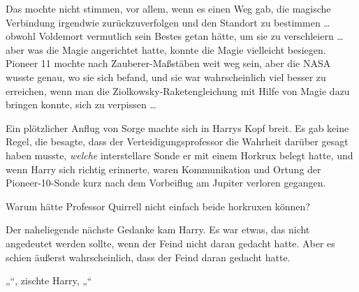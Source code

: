 Das mochte nicht stimmen, vor allem, wenn es einen Weg gab, die magische Verbindung irgendwie zurückzuverfolgen und den Standort zu bestimmen … obwohl Voldemort vermutlich sein Bestes getan hätte, um sie zu verschleiern … aber was die Magie angerichtet hatte, konnte die Magie vielleicht besiegen. Pioneer 11 mochte nach Zauberer-Maßstäben weit weg sein, aber die NASA wusste genau, wo sie sich befand, und sie war wahrscheinlich viel besser zu erreichen, wenn man die Ziolkowsky-Raketengleichung mit Hilfe von Magie dazu bringen konnte, sich zu verpissen …

Ein plötzlicher Anflug von Sorge machte sich in Harrys Kopf breit. Es gab keine Regel, die besagte, dass der Verteidigungsprofessor die Wahrheit darüber gesagt haben musste, \emph{welche} interstellare Sonde er mit einem Horkrux belegt hatte, und wenn Harry sich richtig erinnerte, waren Kommunikation und Ortung der Pioneer-10-Sonde kurz nach dem Vorbeiflug am Jupiter verloren gegangen.

Warum hätte Professor Quirrell nicht einfach beide horkruxen können?

Der naheliegende nächste Gedanke kam Harry. Es war etwas, das nicht angedeutet werden sollte, wenn der Feind nicht daran gedacht hatte. Aber es schien äußerst wahrscheinlich, dass der Feind daran gedacht hatte.

„“, zischte Harry, „“

